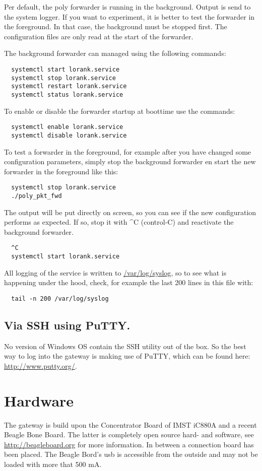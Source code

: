 \documentclass[12pt]{article}
\begin{document}
Per default, the poly forwarder is running in the background. Output is send to the 
system logger. If you want to experiment, it is better to test the forwarder in the
foreground. In that case, the background must be stopped first. The configuration files are
only read at the start of the forwarder.

The background forwarder can managed using the following commands:
\begin{verbatim}
  systemctl start lorank.service
  systemctl stop lorank.service
  systemctl restart lorank.service
  systemctl status lorank.service
\end{verbatim}

To enable or disable the forwarder startup at boottime use the commands:
\begin{verbatim}
  systemctl enable lorank.service
  systemctl disable lorank.service
\end{verbatim}
 
 
 
To test a forwarder in the foreground, for example after you have changed
some configuration parameters, simply stop the background forwarder en 
start the new forwarder in the foreground like this:
\begin{verbatim}
  systemctl stop lorank.service
  ./poly_pkt_fwd
\end{verbatim}
The output will be put directly on screen, so you can see if the new configuration
performs as expected. If so, stop it with \^{}C (control-C) and reactivate the 
background forwarder.
\begin{verbatim}
  ^C
  systemctl start lorank.service
\end{verbatim}

All logging of the service is written to \url{/var/log/syslog}, so
to see what is happening under the hood, check, for example the last 
200 lines in this file with:
\begin{verbatim}
  tail -n 200 /var/log/syslog
\end{verbatim}
 

\subsection{Via SSH using PuTTY.}
No version of Windows OS contain the SSH utility out of the box. So the 
best way to log into the gateway is making use of PuTTY, which can be 
found here: \url{http://www.putty.org/}.   


\section{Hardware}
The gateway is build upon the Concentrator Board of IMST iC880A and a
recent Beagle Bone Board. The latter is completely open source hard- and software, 
see \url{http://beagleboard.org} for more information. In 
between a connection board has been placed. The Beagle Bord's usb is accessible
from the outside and may not be loaded with more that 500 mA.
\end{document}
